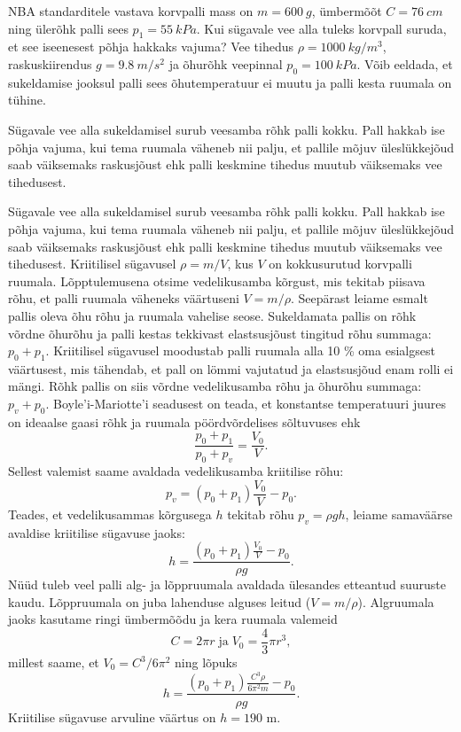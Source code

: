 
NBA standarditele vastava korvpalli mass on $m=\SI{600}{g}$, ümbermõõt
$C=\SI{76}{cm}$ ning ülerõhk palli sees $p_1=\SI{55}{kPa}$. Kui sügavale vee
alla tuleks korvpall suruda, et see iseenesest põhja hakkaks vajuma? Vee tihedus
$\rho=\SI{1000}{kg/m^3}$, raskuskiirendus $g=\SI{9,8}{m/s^2}$ ja õhurõhk
veepinnal $p_0=\SI{100}{kPa}$. Võib eeldada, et sukeldamise jooksul palli sees
õhutemperatuur ei muutu ja palli kesta ruumala on tühine.

\hint
Sügavale vee alla sukeldamisel surub veesamba rõhk palli kokku. Pall hakkab ise põhja vajuma, kui tema ruumala väheneb nii palju, et pallile mõjuv üleslükkejõud saab väiksemaks raskusjõust ehk palli keskmine tihedus muutub väiksemaks vee tihedusest.

\solu
Sügavale vee alla sukeldamisel surub veesamba rõhk palli kokku. Pall hakkab ise põhja vajuma, kui tema ruumala väheneb nii palju, et pallile mõjuv üleslükkejõud saab väiksemaks raskusjõust ehk palli keskmine tihedus muutub väiksemaks vee tihedusest. Kriitilisel sügavusel $\rho=m/V$, kus $V$ on kokkusurutud korvpalli ruumala. Lõpptulemusena otsime vedelikusamba kõrgust, mis tekitab piisava rõhu, et palli ruumala väheneks väärtuseni $V=m/\rho$. Seepärast leiame esmalt pallis oleva õhu rõhu ja ruumala vahelise seose. Sukeldamata pallis on rõhk võrdne õhurõhu ja palli kestas tekkivast elastsusjõust tingitud rõhu summaga: $p_0+p_1$. Kriitilisel sügavusel moodustab palli ruumala alla 10 \% oma esialgsest väärtusest, mis tähendab, et pall on lömmi vajutatud ja elastsusjõud enam rolli ei mängi. Rõhk pallis on siis võrdne vedelikusamba rõhu ja õhurõhu summaga: $p_v+p_0$. Boyle'i-Mariotte'i seadusest on teada, et konstantse temperatuuri juures on ideaalse gaasi rõhk ja ruumala pöördvõrdelises sõltuvuses ehk
\[
\frac{p_0+p_1}{p_0+p_v}=\frac{V_0}{V}.
\]
Sellest valemist saame avaldada vedelikusamba kriitilise rõhu:
\[
p_v = (p_0+p_1) \frac{V_0}{V} - p_0.
\]
Teades, et vedelikusammas kõrgusega $h$ tekitab rõhu $p_v=\rho g h$, leiame samaväärse avaldise kriitilise sügavuse jaoks:
\[
h = \frac{(p_0+p_1) \frac{V_0}{V} - p_0}{\rho g}.
\]
Nüüd tuleb veel palli alg- ja lõppruumala avaldada ülesandes etteantud suuruste kaudu. Lõppruumala on juba lahenduse alguses leitud ($V=m/\rho$). Algruumala jaoks kasutame ringi ümbermõõdu ja kera ruumala valemeid
\[
C = 2\pi r \; \text{ja} \; V_0 = \frac{4}{3}\pi r^3,
\]
millest saame, et $V_0=C^3/6\pi^2$ ning lõpuks
\[
h = \frac{(p_0+p_1) \frac{C^3 \rho}{6\pi^2 m} - p_0}{\rho g}.
\]
Kriitilise sügavuse arvuline väärtus on $h=190$ m.

